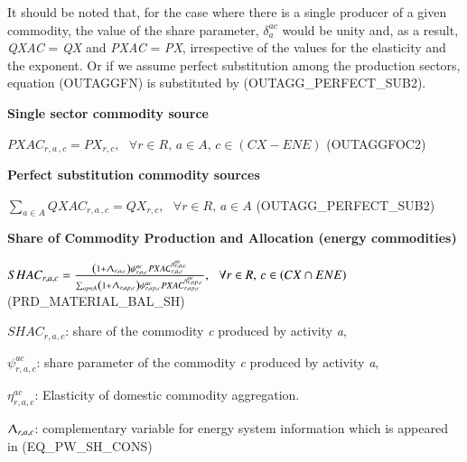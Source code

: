 \documentclass[10pt,a4paper,titlepage,dvipdfmx]{book}
\begin{document}
It should be noted that, for the case where there is a single producer of a given commodity, the value of the share parameter, $\delta _{a}^{ac}$ would be unity and, as a result, \textit{QXAC} = \textit{QX} and \textit{PXAC} = \textit{PX}, irrespective of the values for the elasticity and the exponent. Or if we assume perfect substitution among the production sectors, equation (OUTAGGFN) is substituted by (OUTAGG\_PERFECT\_SUB2).

\begin{flushleft}\textbf{Single sector commodity source}\end{flushleft}


\begin{center}$PXAC_{r,a\,,c}=PX_{r,c},\,\,\,\,\forall r\in R,\,a\in A,\,c\in \left(CX-ENE\right)$ (OUTAGGFOC2)
\end{center}

\begin{flushleft}\textbf{Perfect substitution commodity sources}\end{flushleft}


\begin{center}$\sum _{a\in A}QXAC_{r,a\,,c}=QX_{r,c},\,\,\,\,\forall r\in R,\,a\in A$ (OUTAGG\_PERFECT\_SUB2)
\end{center}

\begin{flushleft}\textbf{Share of Commodity Production and Allocation (energy commodities)}\end{flushleft}


\begin{center}$SHAC_{r,a,c}=\frac{\left(1+\Uplambda _{r,a,c}\right)\psi _{r,a,c}^{ac}PXAC_{r,a,c}^{\eta _{r,a,c}^{ac}}}{\sum _{ap\in A}\left(1+\Uplambda _{r,ap,c}\right)\psi _{r,ap,c}^{ac}PXAC_{r,ap,c}^{\eta _{r,ap,c}^{ac}}},\,\,\,\,\forall r\in R,\,c\in \left(CX\cap ENE\right)$ (PRD\_MATERIAL\_BAL\_SH)
\end{center}

\begin{flushleft}
$SHAC_{r,a,c}$: share of the commodity \textit{c} produced by activity \textit{a},

$\psi _{r,a,c}^{ac}$: share parameter of the commodity \textit{c} produced by activity \textit{a},

$\eta _{r,a,c}^{ac}$: Elasticity of domestic commodity aggregation.

$\Uplambda _{r,a,c}$: complementary variable for energy system information which is appeared in (EQ\_PW\_SH\_CONS)
\end{flushleft}
\end{document}
